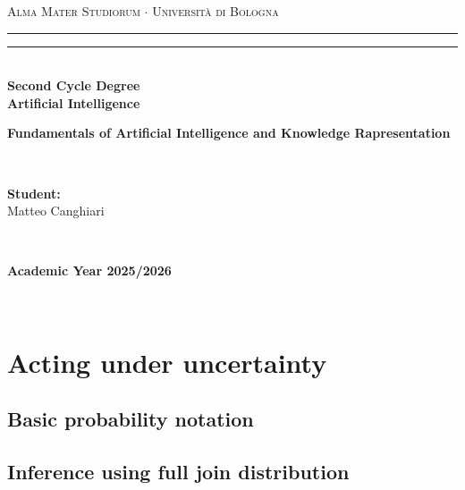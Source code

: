 \documentclass[12pt,a4paper,twoside]{book}
\begin{document}
\pagestyle{empty}
\begin{titlepage}
\begin{center}
    {{\Large{\textsc{Alma Mater Studiorum $\cdot$ Università di Bologna}}}}
    \rule[0.1cm]{\textwidth}{0.1mm}
    \rule[0.5cm]{\textwidth}{0.6mm}\\
    {\small{\bf Second Cycle Degree\\
    Artificial Intelligence}}
\end{center}

\vspace{45mm}

\begin{center}
    \textbf{Fundamentals of Artificial Intelligence and Knowledge Rapresentation}
\end{center}

\vspace{60mm}
\par
\noindent
\begin{minipage}[t]{0.04\textwidth}
~
\end{minipage}
\begin{minipage}[t]{0.4\textwidth}
{{\textbf{Student:}\\
Matteo Canghiari}}
\end{minipage}
\begin{minipage}[t]{0.04\textwidth}
~
\end{minipage}

\vspace{30mm}

\begin{center}
    {\large{\bf Academic Year 2025/2026}}
\end{center}
\end{titlepage}

\restoregeometry

\pagestyle{empty}
\newpage~\newpage
\thispagestyle{empty}

\clearpage
{}
\pagestyle{plain}

\chapter{Acting under uncertainty}


\section{Basic probability notation}


\section{Inference using full join distribution}

\end{document}
